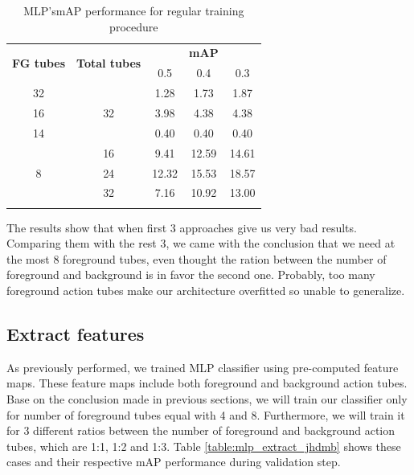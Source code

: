 \documentclass{report}
\begin{document}
\begin{center}
  \begin{longtable}{|| c | c || c c c ||}
    \hline
    \multirow{2}{*}{\textbf{FG tubes}} & \multirow{2}{*}{\textbf{Total tubes}} & {} &  \textbf{mAP} & {} \\
    {} & {} & 0.5 & 0.4 & 0.3 \\
    \hline
    32 & \multirow{3}{*}{32} &1.28 & 1.73 & 1.87  \\
    \cline{1-1} \cline{3-5}
    16 & {} & 3.98 & 4.38 & 4.38  \\
    \cline{1-1} \cline{3-5}
    14 & {} & 0.40 & 0.40 & 0.40 \\
    \hline
    \multirow{3}{*}{8} & 16 & 9.41 & 12.59 & 14.61 \\
    \cline{2-5}
    {} & 24 & 12.32 & 15.53 & 18.57 \\
    \cline{2-5}
    {} & 32 & 7.16 & 10.92 & 13.00 \\
    \hline
    \caption{MLP'smAP performance for regular training procedure}
    \label{table:mlp_reg}
  \end{longtable}
\end{center}

The results show that when first 3 approaches give us very bad results. Comparing them with the rest 3, we came with the conclusion that we
need at the most 8 foreground tubes, even thought the ration between the number of foreground and background is in favor the second one.
Probably, too many foreground action tubes make our architecture overfitted so unable to generalize.

\subsection{Extract features}

As previously performed, we trained MLP classifier using pre-computed feature maps. These feature maps include both foreground and background
action tubes. Base on the conclusion made in previous sections, we will train our classifier only for number of foreground tubes equal with 4
and 8. Furthermore, we will train it for 3 different ratios between the number of foreground and background action tubes, which are 1:1, 1:2
and 1:3. Table \ref{table:mlp_extract_jhdmb} shows these cases and their respective mAP performance during validation step.
\end{document}
